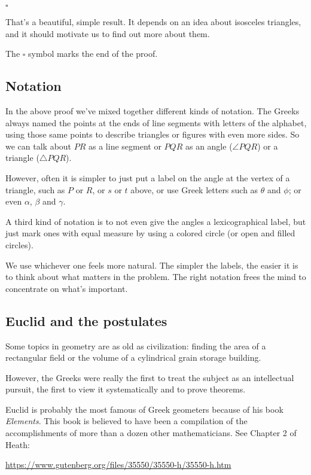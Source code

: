 \documentclass[11pt, oneside]{article}
\begin{document}
$\square$

That's a beautiful, simple result.  It depends on an idea about isosceles triangles, and it should motivate us to find out more about them.

The $\square$ symbol marks the end of the proof.

\subsection*{Notation}
In the above proof we've mixed together different kinds of notation.  The Greeks always named the points at the ends of line segments with letters of the alphabet, using those same points to describe triangles or figures with even more sides.  So we can talk about $PR$ as a line segment or $PQR$ as an angle ($\angle PQR$) or a triangle ($\triangle PQR$).

However, often it is simpler to just put a label on the angle at the vertex of a triangle, such as $P$ or $R$, or $s$ or $t$ above, or use Greek letters such as $\theta$ and $\phi$; or even $\alpha$, $\beta$ and $\gamma$. 

 A third kind of notation is to not even give the angles a lexicographical label, but just mark ones with equal measure by using a colored circle (or open and filled circles).

We use whichever one feels more natural. The simpler the labels, the easier it is to think about what matters in the problem.  The right notation frees the mind to concentrate on what's important.

\subsection*{Euclid and the postulates}

Some topics in geometry are as old as civilization:  finding the area of a rectangular field or the volume of a cylindrical grain storage building.

However, the Greeks were really the first to treat the subject as an intellectual pursuit, the first to view it systematically and to prove theorems.

Euclid is probably the most famous of Greek geometers because of his book \emph{Elements}.  This book is believed to have been a compilation of the accomplishments of more than a dozen other mathematicians.  See Chapter 2 of Heath:

\url{https://www.gutenberg.org/files/35550/35550-h/35550-h.htm}
\end{document}
